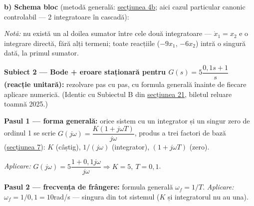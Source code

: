 \documentclass[10pt,a4paper]{article}
\newcommand{\tip}[1]{\textcolor{blue!55!black}{#1}}
\begin{document}
\textbf{b) Schema bloc} (metodă generală: \hyperref[sec:4b]{secțiunea 4b}; aici cazul particular canonic controlabil — 2 integratoare în cascadă):
\begin{center}
\tip{\textit{Notă:} nu există un al doilea sumator între cele două integratoare — $\dot x_1{=}x_2$ e o integrare directă, fără alți termeni; toate reacțiile ($-9x_1$, $-6x_2$) intră o singură dată, la primul sumator.}
\end{center}

\textbf{Subiect 2 — Bode + eroare staționară pentru $G(s)=5\dfrac{0{,}1s+1}{s}$ (reacție unitară):} rezolvare pas cu pas, cu formula generală înainte de fiecare aplicare numerică. (Identic cu Subiectul B din \hyperref[sec:21]{secțiunea 21}, biletul reluare toamnă 2025.)

\textbf{Pasul 1 — forma generală:} orice sistem cu un integrator și un singur zero de ordinul 1 se scrie $G(j\omega)=\dfrac{K(1+j\omega T)}{j\omega}$, produs a trei factori de bază (\hyperref[sec:7]{secțiunea 7}): $K$ (câștig), $1/(j\omega)$ (integrator), $(1+j\omega T)$ (zero).

\textit{Aplicare:} $G(j\omega)=5\dfrac{1+0{,}1j\omega}{j\omega}\Rightarrow K{=}5,\ T{=}0{,}1$.

\textbf{Pasul 2 — frecvența de frângere:} formula generală $\omega_f=1/T$. \textit{Aplicare:} $\omega_f=1/0{,}1=10$rad/s — singura din tot sistemul ($K$ și integratorul nu au una).
\end{document}
